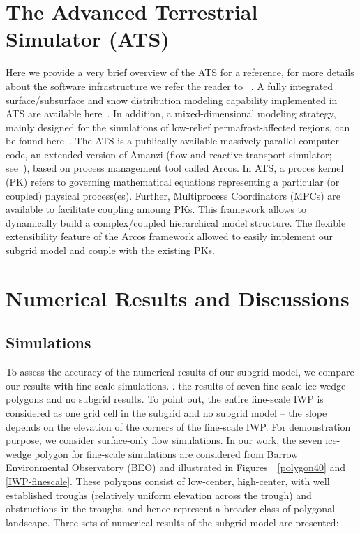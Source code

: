 \documentclass[review,11pt]{elsarticle}
\begin{document}
\section{The Advanced Terrestrial Simulator (ATS)}\label{ATS}
Here we provide a very brief overview of the ATS for a reference, for more details about the software infrastructure we refer the reader to ~\cite{ecoon2016managing, ats-website}. A fully integrated surface/subsurface and snow distribution modeling capability implemented in ATS are available here~\cite{spainter2016integrated, atchley2015}. In addition, a mixed-dimensional modeling strategy, mainly designed for the simulations of low-relief permafrost-affected regions, can be found here~\cite{jan2017}. The ATS is a publically-available massively parallel computer code, an extended version of Amanzi (flow and reactive transport simulator; see~\cite{moulton2012high}), based on process management tool called Arcos. In ATS, a proces kernel (PK) refers to governing mathematical equations representing a particular (or coupled) physical process(es). Further, Multiprocess Coordinators (MPCs) are available to facilitate coupling amoung PKs. This framework allows to dynamically build a complex/coupled hierarchical model structure. The flexible extensibility feature of the Arcos framework allowed to easily implement our subgrid model and couple with the existing PKs.

\section{Numerical Results and Discussions}\label{numerical-tests}
\FloatBarrier
\subsection{Simulations}
To assess the accuracy of the numerical results of our subgrid model, we compare our results with fine-scale simulations. . the results of seven fine-scale ice-wedge polygons and no subgrid results. To point out, the entire fine-scale IWP is considered as one grid cell in the subgrid and no subgrid model -- the slope depends on the elevation of the corners of the fine-scale IWP. For demonstration purpose, we consider surface-only flow simulations. In our work, the seven ice-wedge polygon for fine-scale simulations are considered from Barrow Environmental Observatory (BEO) and illustrated in Figures~~\ref{polygon40} and \ref{IWP-finescale}. These polygons consist of low-center, high-center, with well established troughs (relatively uniform elevation across the trough) and obstructions in the troughs, and hence represent a broader class of polygonal landscape. Three sets of numerical results of the subgrid model are presented:
\end{document}
